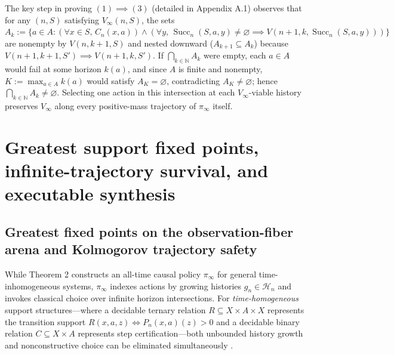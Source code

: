 \documentclass[11pt,a4paper]{article}
\newcounter{none}
\begin{document}
The key step in proving \((1) \implies (3)\) (detailed in Appendix A.1)
observes that for any \((n, S)\) satisfying \(V_\infty(n, S)\), the sets
\(A_k := \{a \in A : (\forall x \in S,\, C_n(x,a)) \land (\forall y,\, \operatorname{Succ}_n(S,a,y) \neq \varnothing \implies V(n+1, k, \operatorname{Succ}_n(S,a,y)))\}\)
are nonempty by \(V(n, k+1, S)\) and nested downward
(\(A_{k+1} \subseteq A_k\)) because
\(V(n+1, k+1, S') \implies V(n+1, k, S')\). If
\(\bigcap_{k \in \mathbb{N}} A_k\) were empty, each \(a \in A\) would
fail at some horizon \(k(a)\), and since \(A\) is finite and nonempty,
\(K := \max_{a \in A} k(a)\) would satisfy \(A_K = \varnothing\),
contradicting \(A_K \neq \varnothing\); hence
\(\bigcap_{k \in \mathbb{N}} A_k \neq \varnothing\). Selecting one
action in this intersection at each \(V_\infty\)-viable history
preserves \(V_\infty\) along every positive-mass trajectory of
\(\pi_\infty\) itself.

\section{Greatest support fixed points, infinite-trajectory survival,
and executable
synthesis}\label{greatest-support-fixed-points-infinite-trajectory-survival-and-executable-synthesis}

\subsection{Greatest fixed points on the observation-fiber arena and
Kolmogorov trajectory
safety}\label{greatest-fixed-points-on-the-observation-fiber-arena-and-kolmogorov-trajectory-safety}

While Theorem 2 constructs an all-time causal policy \(\pi_\infty\) for
general time-inhomogeneous systems, \(\pi_\infty\) indexes actions by
growing histories \(g_n \in \mathcal{H}_n\) and invokes classical choice
over infinite horizon intersections. For \emph{time-homogeneous} support
structures---where a decidable ternary relation
\(R \subseteq X \times A \times X\) represents the transition support
\(R(x,a,z) \iff P_n(x,a)(z) > 0\) and a decidable binary relation
\(C \subseteq X \times A\) represents step certification---both
unbounded history growth and nonconstructive choice can be eliminated
simultaneously
\citep{papadimitriouTsitsiklis1987, chatterjee2016, junges2021}.
\end{document}
